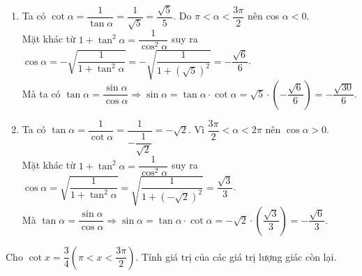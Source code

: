 \begin{ex}
{\begin{enumerate}
			\item Ta có $\cot\alpha =\dfrac{1}{\tan\alpha} =\dfrac{1}{\sqrt{5}} =\dfrac{\sqrt{5}}{5} $. Do  $\pi <\alpha <\dfrac{3\pi}{2} $ nên cos $\alpha <0$. \\
			Mặt  khác từ $1+\tan^2 \alpha =\dfrac{1}{\cos^2 \alpha} $ suy ra $\cos\alpha =-\sqrt{\dfrac{1}{1+\tan^2 \alpha}} =-\sqrt{\dfrac{1}{1+(\sqrt{5})^{2}}} =-\dfrac{\sqrt{6}}{6} $.\\
			 Mà ta có $\tan\alpha =\dfrac{\sin\alpha}{\cos\alpha} \Rightarrow \sin\alpha =\tan\alpha \cdot\cot\alpha =\sqrt{5} \cdot\left(-\dfrac{\sqrt{6}}{6} \right)=-\dfrac{\sqrt{30}}{6} $.
			\item Ta có $\tan\alpha =\dfrac{1}{\cot\alpha} =\dfrac{1}{-\dfrac{1}{\sqrt{2}}} =-\sqrt{2} $. Vì $\dfrac{3\pi}{2}  <\alpha <2\pi $ nên $\cos\alpha > 0$. \\
			Mặt khác từ $1+\tan^2 \alpha =\dfrac{1}{\cos^2 \alpha} $ suy ra $\cos\alpha =\sqrt{\dfrac{1}{1+\tan^2  \alpha}} =\sqrt{\dfrac{1}{1+(-\sqrt{2})^{2}}} =\dfrac{\sqrt{3}}{3} $.\\
			Mà $\tan\alpha =\dfrac{\sin\alpha}{\cos\alpha} \Rightarrow \sin\alpha  =\tan\alpha \cdot\cot\alpha =-\sqrt{2} \cdot\left(\dfrac{\sqrt{3}}{3} \right)=-\dfrac{\sqrt{6}}{3} $.
	\end{enumerate}}
\end{ex}

\begin{ex}%
	Cho $\cot x=\dfrac{3}{4}\left(\pi < x < \dfrac{3\pi}{2}\right)$.  Tính giá trị của các giá trị lượng giác còn lại.
\end{ex}

